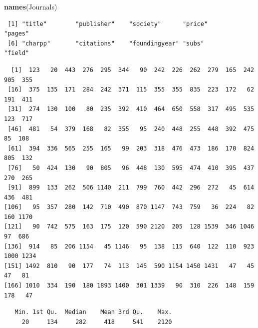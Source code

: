 \documentclass[
]{book}
\newenvironment{Shaded}{\begin{snugshade}}{\end{snugshade}}
\newcommand{\CommentTok}[1]{\textcolor[rgb]{0.56,0.35,0.01}{\textit{#1}}}
\newcommand{\KeywordTok}[1]{\textcolor[rgb]{0.13,0.29,0.53}{\textbf{#1}}}
\newcommand{\NormalTok}[1]{#1}
\newcommand{\OperatorTok}[1]{\textcolor[rgb]{0.81,0.36,0.00}{\textbf{#1}}}
\begin{document}
\begin{Shaded}
\begin{Highlighting}[]
\KeywordTok{names}\NormalTok{(Journals)}
\end{Highlighting}
\end{Shaded}

\begin{verbatim}
 [1] "title"        "publisher"    "society"      "price"        "pages"       
 [6] "charpp"       "citations"    "foundingyear" "subs"         "field"       
\end{verbatim}

\begin{Shaded}
\end{Shaded}

\begin{verbatim}
  [1]  123   20  443  276  295  344   90  242  226  262  279  165  242  905  355
 [16]  375  135  171  284  242  371  115  355  355  835  223  172   62  191  411
 [31]  274  130  100   80  235  392  410  464  650  558  317  495  535  123  717
 [46]  481   54  379  168   82  355   95  240  448  255  448  392  475   85  108
 [61]  394  336  565  255  165   99  203  318  476  473  186  170  824  805  132
 [76]   50  424  130   90  805   96  448  130  595  474  410  395  437  270  265
 [91]  899  133  262  506 1140  211  799  760  442  296  272   45  614  436  481
[106]   95  357  280  142  710  490  870 1147  743  759   36  224   82  160 1170
[121]   90  742  575  163  175  120  590 2120  205  128 1539  346 1046   97  686
[136]  914   85  206 1154   45 1146   95  138  115  640  122  110  923 1000 1234
[151] 1492  810   90  177   74  113  145  590 1154 1450 1431   47   45   47   81
[166] 1010  334  190  180 1893 1400  301 1339   90  310  226  148  159  178   47
\end{verbatim}

\begin{Shaded}
\end{Shaded}

\begin{verbatim}
   Min. 1st Qu.  Median    Mean 3rd Qu.    Max. 
     20     134     282     418     541    2120 
\end{verbatim}
\end{document}
